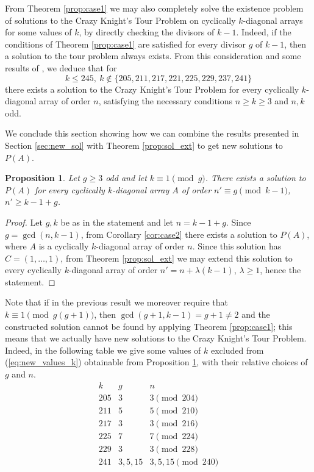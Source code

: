 \documentclass{amsart}
\newtheorem{prop}{Proposition}[section]
\theoremstyle{definition}
\numberwithin{equation}{section}
\begin{document}
From Theorem \ref{prop:case1} we may also completely solve the existence problem of solutions to the Crazy Knight's Tour Problem on cyclically $k$-diagonal arrays for some values of $k$, by directly checking the divisors of $k-1$. Indeed, if the conditions of Theorem \ref{prop:case1} are satisfied for every divisor $g$ of $k-1$, then a solution to the tour problem always exists.
From this consideration and some results of  \cite{CDP}, we deduce that for
\begin{equation} \label{eq:new_values_k}
 k \leq 245, \ k \not \in \{205,   211,   217,   221,   225,   229,   237,   241\}
\end{equation}
there exists a solution to the Crazy Knight's Tour Problem for every cyclically $k$-diagonal  array of order $n$, satisfying the necessary conditions $n\geq k \geq 3$ and $n,k$ odd.


We conclude this section showing how we can combine the results presented in Section \ref{sec:new_sol}
with Theorem \ref{prop:sol_ext} to get new solutions to $P(A)$. 



\begin{prop} \label{prop:finale}
    Let $g\geq 3$ odd and let $ k\equiv 1 \pmod{g}$. There exists a solution to $P(A)$ for every  cyclically $k$-diagonal array  $A$ of order $n' \equiv g \pmod{k-1}$, $n'\geq k-1+g$.
\end{prop}
\begin{proof}
Let $g, k$ be as in the statement and let $n = k-1+g$. Since $g = \gcd(n,k-1)$, from Corollary \ref{cor:case2} there exists a solution to $P(A)$, where  $A$ is a   cyclically $k$-diagonal array  of order $n$. Since this solution has $C = (1,\dotsc, 1)$, from Theorem \ref{prop:sol_ext}  we may extend this solution to every cyclically $k$-diagonal array of order $n'=n+\lambda(k-1)$, $\lambda \geq 1$, hence the statement.
\end{proof}
Note that if in the previous result we moreover require that $k \equiv 1 \pmod{g(g+1)}$, then $\gcd(g+1,k-1)=g+1\neq 2$ and the constructed solution cannot be found by applying Theorem \ref{prop:case1}; this means that we actually have new solutions to the Crazy Knight's Tour Problem.
Indeed, in the following table we give some values of $k$  excluded from  (\ref{eq:new_values_k}) obtainable from Proposition \ref{prop:finale}, with their relative choices of $g$ and $n$.
\[
\begin{array}{c|c|l}
    k & g  & n\\ \hline
    205 & 3 & 3 \pmod{204} \\
    211 & 5& 5 \pmod{210}\\
    217 & 3& 3 \pmod{216}\\
    225 & 7& 7 \pmod{224} \\
    229 & 3& 3 \pmod{228} \\
    241 & 3,5,15& 3,5,15 \pmod{240} \\
\end{array}
\]
\end{document}
